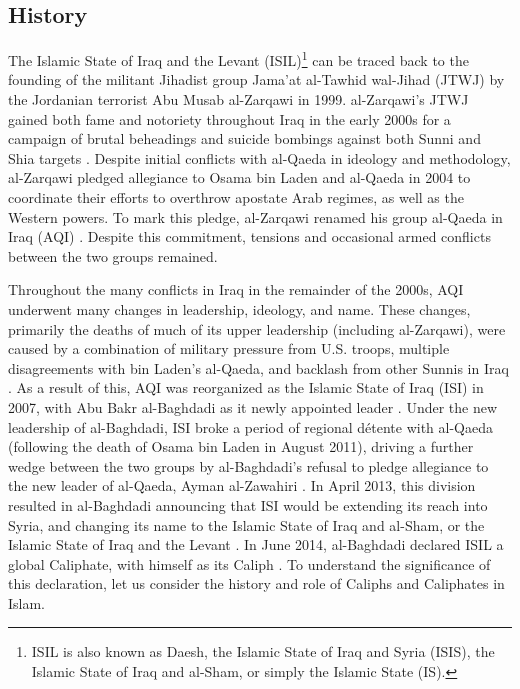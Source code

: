 \documentclass{report}
\begin{document}
    \subsection{History}
    
    The Islamic State of Iraq and the Levant (ISIL)\footnote{ISIL is also known as Daesh, the Islamic State of Iraq and Syria (ISIS),  the Islamic State of Iraq and al-Sham, or simply the Islamic State (IS).} can be traced back to the founding of the militant Jihadist group Jama'at al-Tawhid wal-Jihad (JTWJ) by the Jordanian terrorist Abu Musab al-Zarqawi in 1999. al-Zarqawi's JTWJ gained both fame and notoriety throughout Iraq in the early 2000s for  a campaign of brutal beheadings and suicide bombings against both Sunni and Shia targets \cite{Zelin2014}. Despite initial conflicts with al-Qaeda in ideology and methodology, al-Zarqawi pledged allegiance to Osama bin Laden and al-Qaeda in 2004 to coordinate  their efforts to overthrow apostate Arab regimes, as well as the Western powers. To mark this pledge, al-Zarqawi renamed his group al-Qaeda in Iraq  (AQI) \cite{Gambill2004}. Despite this commitment, tensions and occasional armed conflicts between the two groups remained.
    
    Throughout the many conflicts in Iraq in the remainder of the 2000s, AQI underwent many changes in leadership, ideology, and name. These changes, primarily the deaths of much of its upper leadership (including al-Zarqawi), were caused by a combination of military pressure from U.S. troops, multiple disagreements  with bin Laden's al-Qaeda, and backlash from other Sunnis in Iraq \cite{Zelin2014,Kahl2008}. As a result of this, AQI was reorganized as the Islamic State of Iraq (ISI) in 2007, with Abu Bakr al-Baghdadi as it newly appointed leader \cite{Zelin2014,Shadid2010}. Under the new leadership of al-Baghdadi, ISI broke a period of regional détente with al-Qaeda (following the death of Osama bin Laden in August 2011), driving a further wedge between the two groups by al-Baghdadi's refusal to pledge allegiance to the new leader of al-Qaeda, Ayman al-Zawahiri \cite{Al-Jawlani}. In April 2013, this division resulted in  al-Baghdadi announcing that ISI would be extending its reach into Syria, and changing its name to the Islamic State of Iraq and al-Sham, or the Islamic State of Iraq and the Levant \cite{Zelin2014,Al-Hussaini2013}. In June 2014, al-Baghdadi declared ISIL a global Caliphate, with himself as its Caliph \cite{Mortada2014,TheWeek2014}. To understand the significance of this declaration, let us consider the history and role of Caliphs and Caliphates in Islam.
    
\end{document}
